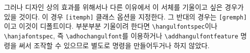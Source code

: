 \documentclass[
	12pt,
	a4paper,
	kosection,
	footnote,
	microtype,
	figtabcapt,
]{oblivoir}
\def\cs#1{\texttt{\textbackslash #1}}
\def\oblivoirdblquote#1{``#1''}
\newcommand\xobclass{x\-ob\-liv\-oir\oblivoirallowbreak}
\newcommand\obclass{ob\-liv\-oir\oblivoirallowbreak}
\def\xetexko{\XeTeX-\ko}
\begin{document}
그러나 디자인 상의 효과를 위해서나 다른 이유에서 
이 서체를 기울이고 싶은 경우가 있을 것이다.
이 경우 \texttt{[itemph]} 클래스 옵션을 지정한다.
그 반대의 경우는 \texttt{[gremph]}이고 이것이 디폴트이다. 부분부분 기울이려 한다면 \cs{hangulfontspec}이나
\cs{hanjafontspec}, 즉 \cs{adhochangulfont}를 이용하거나 \cs{addhangulfontfeature} 명령을 써서 조작할 수 있으므로 별도로 명령을 만들어두거나 하지 않았다.

%
%




\end{document}
